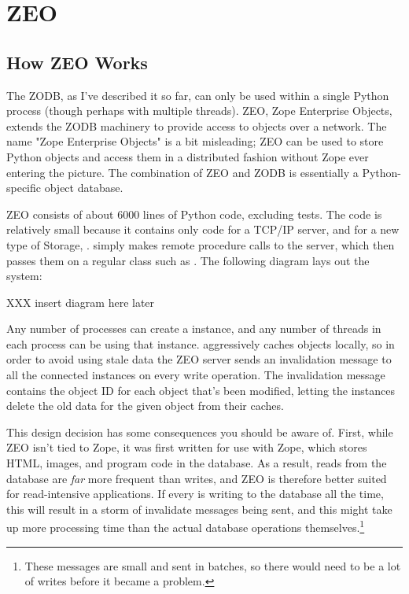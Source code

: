 
   
\section{ZEO}
\label{zeo}

\subsection{How ZEO Works}

The ZODB, as I've described it so far, can only be used within a
single Python process (though perhaps with multiple threads).  ZEO,
Zope Enterprise Objects, extends the ZODB machinery to provide access
to objects over a network.  The name "Zope Enterprise Objects" is a
bit misleading; ZEO can be used to store Python objects and access
them in a distributed fashion without Zope ever entering the picture.
The combination of ZEO and ZODB is essentially a Python-specific
object database.

ZEO consists of about 6000 lines of Python code, excluding tests.  The
code is relatively small because it contains only code for a TCP/IP
server, and for a new type of Storage, .
 simply makes remote procedure calls to the
server, which then passes them on a regular  class such
as .  The following diagram lays out the system:

XXX insert diagram here later

Any number of processes can create a 
instance, and any number of threads in each process can be using that
instance.   aggressively caches objects
locally, so in order to avoid using stale data the ZEO server sends
an invalidation message to all the connected 
instances on every write operation.  The invalidation message contains
the object ID for each object that's been modified, letting the
 instances delete the old data for the
given object from their caches.

This design decision has some consequences you should be aware of.
First, while ZEO isn't tied to Zope, it was first written for use with
Zope, which stores HTML, images, and program code in the database.  As
a result, reads from the database are \emph{far} more frequent than
writes, and ZEO is therefore better suited for read-intensive
applications.  If every  is writing to the
database all the time, this will result in a storm of invalidate
messages being sent, and this might take up more processing time than
the actual database operations themselves.\footnote{These messages are
small and sent in batches, so there would need to be a lot of writes
before it became a problem.}


